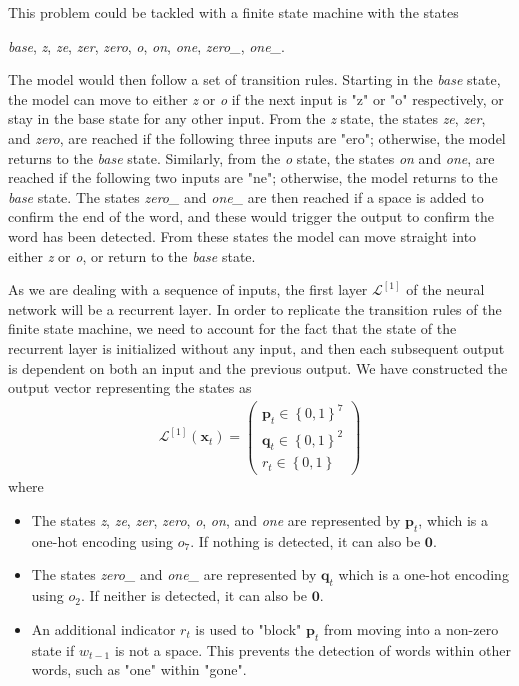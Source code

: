 \documentclass{somasmsc}
\begin{document}
This problem could be tackled with a finite state machine with the states
\begin{center}
    \textit{base}, \textit{z}, \textit{ze}, \textit{zer}, \textit{zero}, \textit{o}, \textit{on}, \textit{one}, \textit{zero\_}, \textit{one\_}.
\end{center}
The model would then follow a set of transition rules. Starting in the \textit{base} state, the model can move to either \textit{z} or \textit{o} if the next input is "z" or "o" respectively, or stay in the base state for any other input. From the \textit{z} state, the states \textit{ze}, \textit{zer}, and \textit{zero}, are reached if the following three inputs are "ero"; otherwise, the model returns to the \textit{base} state. Similarly, from the \textit{o} state, the states \textit{on} and \textit{one}, are reached if the following two inputs are "ne"; otherwise, the model returns to the \textit{base} state. The states \textit{zero\_} and \textit{one\_} are then reached if a space is added to confirm the end of the word, and these would trigger the output to confirm the word has been detected. From these states the model can move straight into either \textit{z} or \textit{o}, or return to the \textit{base} state.

As we are dealing with a sequence of inputs, the first layer $\mathcal{L}^{\left[1\right]}$ of the neural network will be a recurrent layer. In order to replicate the transition rules of the finite state machine, we need to account for the fact that the state of the recurrent layer is initialized without any input, and then each subsequent output is dependent on both an input and the previous output. We have constructed the output vector representing the states as
\begin{align*}
    \mathcal{L}^{\left[1\right]}\left(\pmb{x}_t\right) =
    \begin{pmatrix}
        \pmb{p}_t \in \left\{0,1\right\}^7 \\
        \pmb{q}_t \in \left\{0,1\right\}^2 \\
        r_t \in \left\{0,1\right\}
    \end{pmatrix}
\end{align*}
where
\begin{itemize}
    \item The states \textit{z}, \textit{ze}, \textit{zer}, \textit{zero}, \textit{o}, \textit{on}, and \textit{one} are represented by $\pmb{p}_t$, which is a one-hot encoding using $o_7$. If nothing is detected, it can also be $\mathbf{0}$.
    \item The states \textit{zero\_} and \textit{one\_} are represented by $\pmb{q}_t$ which is a one-hot encoding using $o_2$. If neither is detected, it can also be $\mathbf{0}$.
    \item An additional indicator $r_t$ is used to "block" $\pmb{p}_t$ from moving into a non-zero state if $w_{t-1}$ is not a space. This prevents the detection of words within other words, such as "one" within "gone".
\end{itemize}
\end{document}
